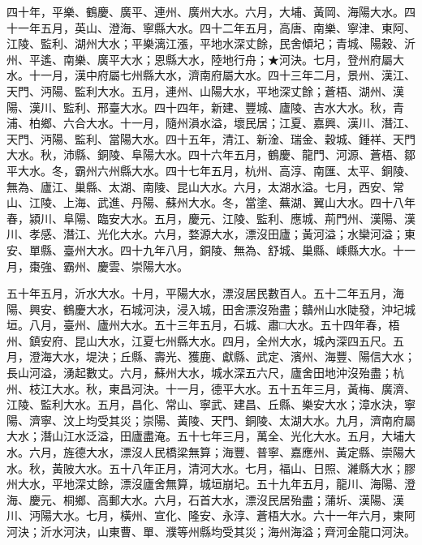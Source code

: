 \begin{pinyinscope}
四十年，平樂、鶴慶、廣平、連州、廣州大水。六月，大埔、黃岡、海陽大水。四十一年五月，英山、澄海、寧縣大水。四十二年五月，高唐、南樂、寧津、東阿、江陵、監利、湖州大水；平樂漓江漲，平地水深丈餘，民舍傾圮；青城、陽穀、沂州、平遙、南樂、廣平大水；恩縣大水，陸地行舟；★河決。七月，登州府屬大水。十一月，漢中府屬七州縣大水，濟南府屬大水。四十三年二月，景州、漢江、天門、沔陽、監利大水。五月，連州、山陽大水，平地深丈餘；蒼梧、湖州、漢陽、漢川、監利、邢臺大水。四十四年，新建、豐城、廬陵、吉水大水。秋，青浦、柏鄉、六合大水。十一月，隨州溳水溢，壞民居；江夏、嘉興、漢川、潛江、天門、沔陽、監利、當陽大水。四十五年，清江、新淦、瑞金、穀城、鍾祥、天門大水。秋，沛縣、銅陵、阜陽大水。四十六年五月，鶴慶、龍門、河源、蒼梧、鄒平大水。冬，霸州六州縣大水。四十七年五月，杭州、高淳、南匯、太平、銅陵、無為、廬江、巢縣、太湖、南陵、昆山大水。六月，太湖水溢。七月，西安、常山、江陵、上海、武進、丹陽、蘇州大水。冬，當塗、蕪湖、翼山大水。四十八年春，潁川、阜陽、臨安大水。五月，慶元、江陵、監利、應城、荊門州、漢陽、漢川、孝感、潛江、光化大水。六月，婺源大水，漂沒田廬；黃河溢；水欒河溢；東安、單縣、臺州大水。四十九年八月，銅陵、無為、舒城、巢縣、嵊縣大水。十一月，棗強、霸州、慶雲、崇陽大水。

五十年五月，沂水大水。十月，平陽大水，漂沒居民數百人。五十二年五月，海陽、興安、鶴慶大水，石城河決，浸入城，田舍漂沒殆盡；贛州山水陡發，沖圮城垣。八月，臺州、廬州大水。五十三年五月，石城、肅□大水。五十四年春，梧州、鎮安府、昆山大水，江夏七州縣大水。四月，全州大水，城內深四五尺。五月，澄海大水，堤決；丘縣、壽光、獲鹿、獻縣、武定、濱州、海豐、陽信大水；長山河溢，湧起數丈。六月，蘇州大水，城水深五六尺，廬舍田地沖沒殆盡；杭州、枝江大水。秋，東昌河決。十一月，德平大水。五十五年三月，黃梅、廣濟、江陵、監利大水。五月，昌化、常山、寧武、建昌、丘縣、樂安大水；漳水決，寧陽、濟寧、汶上均受其災；崇陽、黃陵、天門、銅陵、太湖大水。九月，濟南府屬大水；潛山江水泛溢，田廬盡淹。五十七年三月，萬全、光化大水。五月，大埔大水。六月，旌德大水，漂沒人民橋梁無算；海豐、普寧、嘉應州、黃定縣、崇陽大水。秋，黃陂大水。五十八年正月，清河大水。七月，福山、日照、濰縣大水；膠州大水，平地深丈餘，漂沒廬舍無算，城垣崩圮。五十九年五月，龍川、海陽、澄海、慶元、桐鄉、高郵大水。六月，石首大水，漂沒民居殆盡；蒲圻、漢陽、漢川、沔陽大水。七月，橫州、宣化、隆安、永淳、蒼梧大水。六十一年六月，東阿河決；沂水河決，山東曹、單、濮等州縣均受其災；海州海溢；齊河金龍口河決。


\end{pinyinscope}
